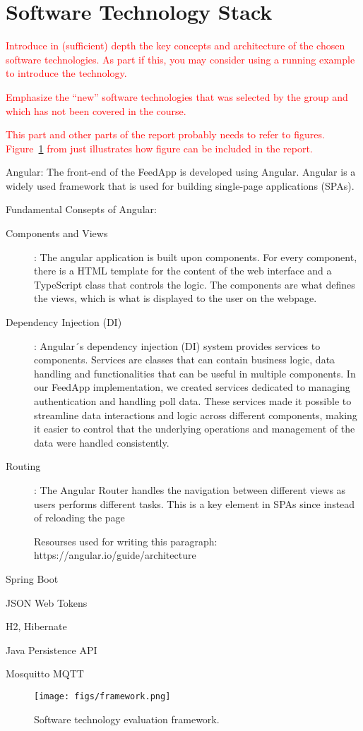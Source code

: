 \section{Software Technology Stack}
\label{sec:technology}

\textcolor{red}{Introduce in (sufficient) depth the key concepts and architecture of the chosen software technologies. As part if this, you may consider using a running example to introduce the technology.}

\textcolor{red}{Emphasize the “new” software technologies that was selected by the group and which has not been covered in the course.}

\textcolor{red}{This part and other parts of the report probably needs to refer to
figures. Figure~\ref{fig:framework} from \cite{brown:96} just
illustrates how figure can be included in the report.}

Angular:
The front-end of the FeedApp is developed using Angular. Angular is a widely used framework that is used for building single-page applications (SPAs).

Fundamental Consepts of Angular: 
\begin{description}
\item[Components and Views]: The angular application is built upon components. For every component, there is a HTML template for the content of the web interface and a TypeScript class that controls the logic. The components are what defines the views, which is what  is displayed to the user on the webpage. 
\item[Dependency Injection (DI)]: Angular´s dependency injection (DI) system provides services to components. Services are classes that can contain business logic, data handling and functionalities that can be useful in multiple components. In our FeedApp implementation, we created services dedicated to managing authentication and handling poll data. These services made it possible to streamline data interactions and logic across different components, making it easier to control that the underlying operations and management of the data were handled consistently. 
\item[Routing]: The Angular Router handles the navigation between different views as users performs different tasks. This is a key element in SPAs since instead of reloading the page

Resourses used for writing this paragraph: https://angular.io/guide/architecture 
\end{description}

Spring Boot 

JSON Web Tokens 

H2, Hibernate 

Java Persistence API 

Mosquitto MQTT

\begin{figure}
  \centering
  \texttt{[image: figs/framework.png]}
  \caption{Software technology evaluation framework.}
  \label{fig:framework}
\end{figure}
